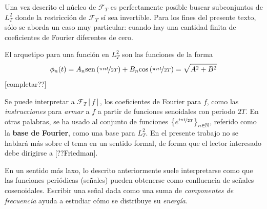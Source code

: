 Una vez descrito el núcleo de $\mathcal{F}_{T}$ es perfectamente posible buscar subconjuntos de $L^{2}_T$ donde la restricción de $\mathcal{F}_{T}$ sí sea invertible.
%
%
Para los fines del presente texto, sólo se aborda un caso muy particular: cuando hay una cantidad finita de coeficientes de Fourier diferentes de cero.

El arquetipo para una función en $L^{2}_T$ son las funciones de la forma
\begin{equation}
\phi_n(t) = A_n \mathrm{sen}\left( \nicefrac{\pi n t }{2T} \right) + B_n \mathrm{cos}\left( \nicefrac{\pi n t }{2T} \right)
= \sqrt{A^{2}+B^{2}} 
\end{equation}
[completar??]

Se puede interpretar a $\mathcal{F}_{T}[f]$, los coeficientes de Fourier para $f$, como las \textit{instrucciones} para \textit{armar} a $f$ a partir de funciones senoidales con periodo $2T$.
%
%
%
En otras palabras, se ha usado al conjunto de funciones $\left\{ e^{\nicefrac{i {n} t}{2 T}} \right\}_{n\in \mathbb{N}}$, referido como la \textbf{base de Fourier}, como una base para $L^{2}_T$.
%
En el presente trabajo no se hablará más sobre el tema en un sentido formal, de forma que el lector interesado debe dirigirse a [??Friedman].

En un sentido más laxo, lo descrito anteriormente suele interpretarse como que las funciones periódicas (señales) pueden obtenerse como confluencia de señales cosenoidales.
%
Escribir una señal dada como una suma de \textit{componentes de frecuencia} ayuda a estudiar cómo se distribuye su \textit{energía}.


%
%

